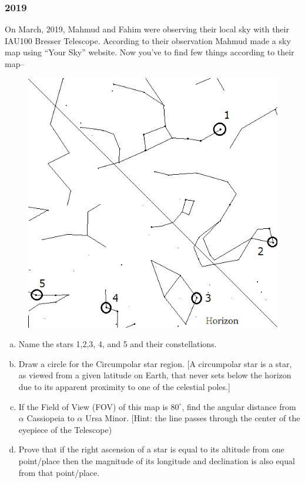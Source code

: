 \documentclass[a4paper,12pt]{extarticle}
\begin{document}
\subsubsection{2019}
On  March, 2019, Mahmud and Fahim were observing their local sky with their IAU100 Bresser Telescope. According to their observation Mahmud made a sky map using “Your Sky” website. Now you’ve to find few things according to their map--

\begin{figure}[H]
    \centering
    \includegraphics[width=0.8\linewidth]{BDOAA_19.png}
\end{figure}
\begin{enumerate}[a.]
    \item Name the stars 1,2,3, 4, and 5 and their constellations.
    \item Draw a circle for the Circumpolar star region. [A circumpolar star is a star, as viewed from a given latitude on Earth, that never sets below the horizon due to its apparent proximity to one of the celestial poles.]
    \item If the Field of View (FOV) of this map is $80^\circ$, find the angular distance from $\alpha$ Cassiopeia to $\alpha$ Ursa Minor. [Hint: the line passes through the center of the eyepiece of the Telescope)
    \item Prove that if the right ascension of a star is equal to its altitude from one point/place then the magnitude of its longitude and declination is also equal from that point/place.
\end{enumerate}
\end{document}
